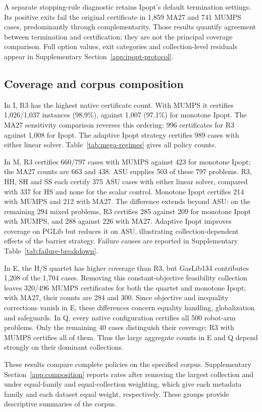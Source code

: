 \documentclass[pdflatex,sn-mathphys-num]{sn-jnl}
\theoremstyle{thmstyleone}
\theoremstyle{thmstylethree}
\begin{document}
A separate stopping-rule diagnostic retains Ipopt's default termination
settings. Its positive exits fail the original certificate in 1,859 MA27
and 741 MUMPS cases, predominantly through complementarity. Those results
quantify agreement between termination and certification; they are not the
principal coverage comparison. Full option values, exit categories and
collection-level residuals appear in Supplementary
Section~\ref{app:ipopt-protocol}.

\subsection{Coverage and corpus composition}
In I, R3 has the highest native certificate count. With MUMPS it certifies
1,026/1,037 instances (98.9\%), against 1,007 (97.1\%) for monotone Ipopt.
The MA27 sensitivity comparison reverses this ordering: 996 certificates
for R3 against 1,008 for Ipopt. The adaptive Ipopt strategy certifies 989
cases with either linear solver. Table~\ref{tab:mega-regimes} gives all
policy counts.

In M, R3 certifies 660/797 cases with MUMPS against 423 for monotone Ipopt;
the MA27 counts are 663 and 438. ASU supplies 503 of these 797 problems.
R3, HH, SH and SS each certify 375 ASU cases with either linear solver,
compared with 337 for HS and none for the scalar control. Monotone Ipopt
certifies 214 with MUMPS and 212 with MA27. The difference extends beyond
ASU: on the remaining 294 mixed problems, R3 certifies 285 against 209
for monotone Ipopt with MUMPS, and 288 against 226 with MA27. Adaptive
Ipopt improves coverage on PGLib but reduces it on ASU, illustrating
collection-dependent effects of the barrier strategy. Failure causes are
reported in Supplementary Table~\ref{tab:failure-breakdown}.

In E, the H/S quartet has higher coverage than R3, but GasLib134 contributes
1,208 of the 1,704 cases. Removing this constant-objective feasibility
collection leaves 320/496 MUMPS certificates for both the quartet and
monotone Ipopt; with MA27, their counts are 284 and 300. Since objective
and inequality corrections vanish in E, these differences concern equality
handling, globalization and safeguards. In Q, every native configuration
certifies all 500 robot-arm problems. Only the remaining 40 cases
distinguish their coverage; R3 with MUMPS certifies all of them. Thus the
large aggregate counts in E and Q depend strongly on their dominant
collections.

These results compare complete policies on the specified corpus.
Supplementary Section~\ref{app:composition} reports rates after removing
the largest collection and under equal-family and equal-collection
weighting, which give each metadata family and each dataset equal weight,
respectively. These groups provide descriptive summaries of the corpus.
\end{document}

